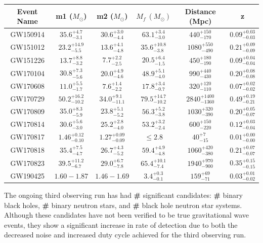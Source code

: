 \documentclass [12pt, proquest]{uwthesis}[2019]
\begin{document}
\begin{center}
\begin{tabular}{| c | c | c | c | c | c |}
\hline
Event Name & m1 ($M_\odot$) & m2 ($M_\odot$) & $M_f\ (M_\odot)$ & Distance (Mpc) & z\\
\hline \hline
GW150914 & $35.6^{+4.7}_{-3.1}$ & $30.6^{+3.0}_{-4.4}$ & $63.1^{+3.4}_{-3.0}$ & $440^{+150}_{-170}$ & $0.09^{+0.03}_{-0.03}$\\
\hline
GW151012 & $23.2^{+14.9}_{-5.5}$ & $13.6^{+4.1}_{-4.8}$  & $35.6^{+10.8}_{-3.8}$ & $1080^{+550}_{-490}$& $0.21^{+0.09}_{-0.09}$\\
\hline
GW151226 & $13.7^{+8.8}_{-3.2}$ & $7.7^{+2.2}_{-2.5}$ & $20.5^{+6.4}_{-1.5}$ & $450^{+180}_{-190}$ & $0.09^{+0.04}_{-0.04}$\\
\hline
\hline
GW170104 & $30.8^{+7.3}_{-5.6}$ & $20.0^{+4.9}_{-4.6}$ & $48.9^{+5.1}_{-4.0}$ & $990^{+440}_{-430}$ & $0.20^{+0.08}_{-0.08}$\\
\hline
GW170608 & $11.0^{+5.5}_{-1.7}$ & $7.6^{+1.4}_{-2.2}$ & $17.8^{+3.4}_{-0.7}$ & $320^{+120}_{-110}$ & $0.07^{+0.02}_{-0.02}$\\
\hline
GW170729 & $50.2^{+16.2}_{-10.2}$ & $34.0^{+9.1}_{-11.1}$ & $79.5^{+14.7}_{-10.2}$ & $2840^{+1400}_{-1360}$ & $0.49^{+0.19}_{-0.21}$\\
\hline
GW170809 & $35.0^{+8.3}_{-5.9}$ & $23.8^{+5.1}_{-5.2}$ & $56.3^{+5.2}_{-3.8}$ & $1030^{+320}_{-390}$ & $0.20^{+0.05}_{-0.07}$\\
\hline
GW170814 & $30.6^{+5.6}_{-3.0}$ & $25.2^{+2.8}_{-4.0}$ & $53.2^{+3.2}_{-2.4}$ & $600^{+150}_{-220}$ & $0.12^{+0.03}_{-0.04}$\\
\hline
GW170817 & $1.46^{+0.12}_{-0.10}$ & $1.27^{+0.09}_{-0.09}$ & $\le2.8$ & $40^{+7}_{-15}$ & $0.01^{+0.00}_{-0.00}$\\
\hline
GW170818 & $35.4^{+7.5}_{-4.7}$ & $26.7^{+4.3}_{-5.2}$ & $59.4^{+4.9}_{-4.8}$ & $1060^{+420}_{-380}$ & $0.21^{+0.07}_{-0.07}$\\
\hline
GW170823 & $39.5^{+11.2}_{-6.7}$ & $29.0^{+6.7}_{-7.8}$ & $65.4^{+10.1}_{-7.4}$ & $1940^{+970}_{-900}$ & $0.35^{+0.15}_{-0.15}$\\
\hline
\hline
GW190425 & $1.60-1.87$ & $1.46-1.69$ & $3.4^{+0.3}_{-0.1}$ & $159^{+69}_{-71}$ & $0.03^{+0.01}_{-0.02}$\\
\hline
\end{tabular}
\label{gwTable}
\end{center}

The ongoing third observing run has had \textbf{\#} significant candidates: \textbf{\#} binary black holes, \textbf{\#} binary neutron stars, and \textbf{\#} black hole neutron star systems. Although these candidates have not been verified to be true gravitational wave events, they show a significant increase in rate of detection due to both the decreased noise and increased duty cycle achieved for the third observing run.
\end{document}
